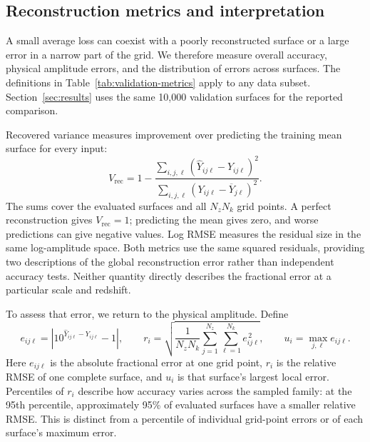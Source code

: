 \subsection{Reconstruction metrics and interpretation}
\label{sec:reconstruction-metrics}

A small average loss can coexist with a poorly reconstructed surface or a
large error in a narrow part of the grid. We therefore measure overall
accuracy, physical amplitude errors, and the distribution of errors across
surfaces. The definitions in Table~\ref{tab:validation-metrics} apply to
any data subset. Section~\ref{sec:results} uses the same 10,000 validation
surfaces for the reported comparison.

Recovered variance measures improvement over predicting the training mean
surface for every input:
\begin{equation}
  V_{\mathrm{rec}}
  =1-
  \frac{\displaystyle\sum_{i,j,\ell}
    \left(\widehat Y_{ij\ell}-Y_{ij\ell}\right)^2}
  {\displaystyle\sum_{i,j,\ell}
    \left(Y_{ij\ell}-\overline Y_{j\ell}\right)^2}.
  \label{eq:recovered-variance}
\end{equation}
The sums cover the evaluated surfaces and all $N_zN_k$ grid points.
A perfect reconstruction gives $V_{\mathrm{rec}}=1$; predicting the mean
gives zero, and worse predictions can give negative values.
Log RMSE measures the residual size in the same log-amplitude space.
Both metrics use the same squared residuals, providing two descriptions
of the global reconstruction error rather than independent accuracy tests.
Neither quantity directly describes the fractional error at a particular
scale and redshift.

To assess that error, we return to the physical amplitude. Define
\begin{equation}
  e_{ij\ell}
  =\left|10^{\widehat Y_{ij\ell}-Y_{ij\ell}}-1\right|,
  \qquad
  r_i=\sqrt{\frac{1}{N_zN_k}
    \sum_{j=1}^{N_z}\sum_{\ell=1}^{N_k}e_{ij\ell}^{\,2}},
  \qquad u_i=\max_{j,\ell}e_{ij\ell}.
  \label{eq:physical-relative-errors}
\end{equation}
Here $e_{ij\ell}$ is the absolute fractional error at one grid point,
$r_i$ is the relative RMSE of one complete surface, and $u_i$ is that
surface's largest local error. Percentiles of
$r_i$ describe how accuracy varies across the sampled family: at the 95th
percentile, approximately 95\% of evaluated surfaces have a smaller
relative RMSE. This is distinct from a percentile of individual grid-point
errors or of each surface's maximum error.

